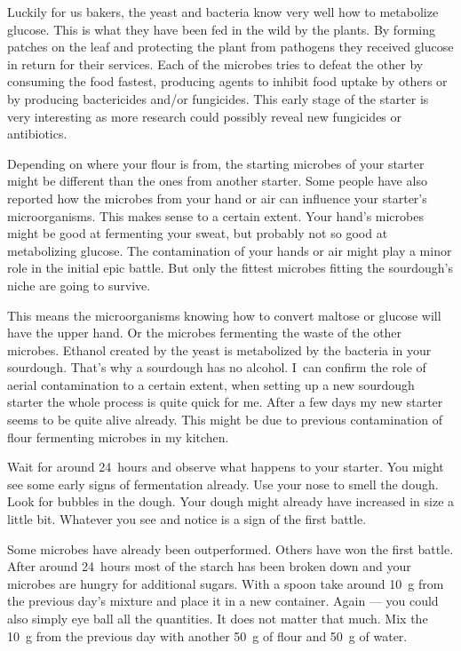 Luckily for us
bakers, the yeast and bacteria know very well how to metabolize
glucose. This is what they have been fed in the wild by the plants.
By forming patches on the leaf and protecting the plant from
pathogens they received glucose in return for their services.
Each of the microbes tries to defeat the other by consuming the
food fastest, producing agents to inhibit food uptake by others or by producing
bactericides and/or fungicides. This early stage of the starter
is very interesting as more research could possibly reveal
new fungicides or antibiotics. 

Depending on where your flour
is from, the starting microbes of your starter might be different
than the ones from another starter. Some people have also reported
how the microbes from your hand or air can influence your starter's
microorganisms. This makes sense to a certain extent. Your
hand's microbes might be good at fermenting your sweat, but
probably not so good at metabolizing glucose. The contamination
of your hands or air might play a minor role in the initial epic
battle. But only the fittest microbes fitting the sourdough's
niche are going to survive. 

This means the microorganisms knowing
how to convert maltose or glucose will have the upper hand. Or the
microbes fermenting the waste of the other microbes. Ethanol created
by the yeast is metabolized by the bacteria in your sourdough. That's
why a sourdough has no alcohol. I~can confirm the role of aerial
contamination to a certain extent, when setting up a new sourdough
starter the whole process is quite quick for me. After a few
days my new starter seems to be quite alive already. This might
be due to previous contamination of flour fermenting microbes in
my kitchen.

Wait for around 24~hours and observe what happens to your starter.
You might see some early signs of fermentation already. Use your nose
to smell the dough. Look for bubbles in the dough. Your dough
might already have increased in size a little bit. Whatever
you see and notice is a sign of the first battle.

Some microbes
have already been outperformed. Others have won the first battle.
After around 24~hours most of the starch has been broken down
and your microbes are hungry for additional sugars. With a spoon
take around \qty{10}{\gram} from the previous day's mixture and place
it in a new container. Again --- you could also simply eye ball
all the quantities. It does not matter that much. Mix the \qty{10}{\gram}
from the previous day with another \qty{50}{\gram} of flour
and \qty{50}{\gram} of water. 

